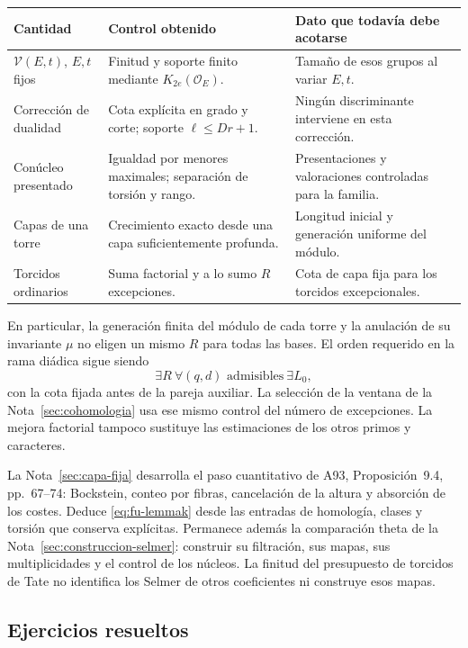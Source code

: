 \begin{center}
\small
\begin{tabularx}{\textwidth}{@{}p{}YY@{}}
\toprule
Cantidad & Control obtenido & Dato que todavía debe acotarse\\
\midrule
$\mathcal V(E,t)$, $E,t$ fijos
 & Finitud y soporte finito mediante $K_{2e}(\mathcal O_E)$.
 & Tamaño de esos grupos al variar $E,t$.\\
Corrección de dualidad
 & Cota explícita en grado y corte; soporte $\ell\le Dr+1$.
 & Ningún discriminante interviene en esta corrección.\\
Conúcleo presentado
 & Igualdad por menores maximales; separación de torsión y rango.
 & Presentaciones y valoraciones controladas para la familia.\\
Capas de una torre
 & Crecimiento exacto desde una capa suficientemente profunda.
 & Longitud inicial y generación uniforme del módulo.\\
Torcidos ordinarios
 & Suma factorial y a lo sumo $R$ excepciones.
 & Cota de capa fija para los torcidos excepcionales.\\
\bottomrule
\end{tabularx}
\end{center}

En particular, la generación finita del módulo de cada torre
y la anulación de su invariante $\mu$ no eligen un mismo $R$
para todas las bases.
El orden requerido en la rama diádica sigue siendo
\[
 \exists R\ \forall(q,d)\text{ admisibles}\ \exists L_0,
\]
con la cota fijada antes de la pareja auxiliar.
La selección de la ventana de la Nota~\ref{sec:cohomologia}
usa ese mismo control del número de excepciones.
La mejora factorial tampoco sustituye las estimaciones de
los otros primos y caracteres.

La Nota~\ref{sec:capa-fija} desarrolla el paso cuantitativo de A93,
Proposición~9.4, pp.~67--74: Bockstein, conteo por fibras,
cancelación de la altura y absorción de los costes.
Deduce \eqref{eq:fu-lemmak} desde las entradas de homología,
clases y torsión que conserva explícitas. Permanece además
la comparación theta de la Nota~\ref{sec:construccion-selmer}:
construir su filtración, sus mapas, sus multiplicidades y el
control de los núcleos. La finitud del presupuesto de torcidos
de Tate no identifica los Selmer de otros coeficientes ni
construye esos mapas.

\subsection{Ejercicios resueltos}

